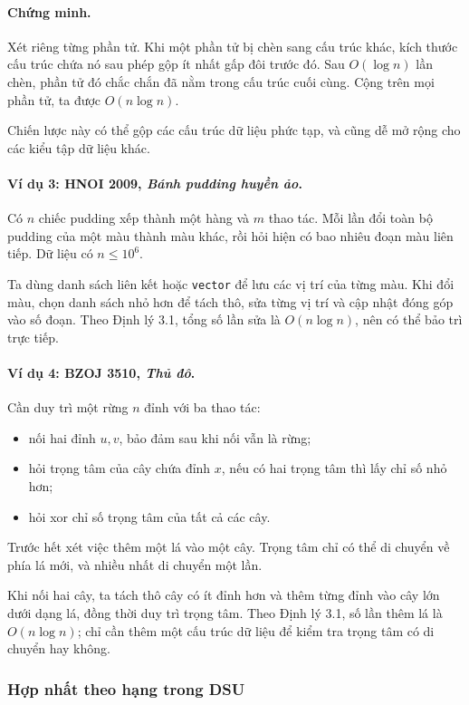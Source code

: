 \documentclass[11pt]{article}
\begin{document}
\paragraph{Chứng minh.}
Xét riêng từng phần tử. Khi một phần tử bị chèn sang cấu trúc khác, kích thước
cấu trúc chứa nó sau phép gộp ít nhất gấp đôi trước đó. Sau \(O(\log n)\) lần
chèn, phần tử đó chắc chắn đã nằm trong cấu trúc cuối cùng. Cộng trên mọi phần
tử, ta được \(O(n\log n)\).

Chiến lược này có thể gộp các cấu trúc dữ liệu phức tạp, và cũng dễ mở rộng cho
các kiểu tập dữ liệu khác.

\paragraph{Ví dụ 3: HNOI 2009, \emph{Bánh pudding huyền ảo}.}
Có \(n\) chiếc pudding xếp thành một hàng và \(m\) thao tác. Mỗi lần đổi toàn bộ
pudding của một màu thành màu khác, rồi hỏi hiện có bao nhiêu đoạn màu liên
tiếp. Dữ liệu có \(n\le 10^6\).

Ta dùng danh sách liên kết hoặc \texttt{vector} để lưu các vị trí của từng màu.
Khi đổi màu, chọn danh sách nhỏ hơn để tách thô, sửa từng vị trí và cập nhật
đóng góp vào số đoạn. Theo Định lý 3.1, tổng số lần sửa là \(O(n\log n)\), nên
có thể bảo trì trực tiếp.

\paragraph{Ví dụ 4: BZOJ 3510, \emph{Thủ đô}.}
Cần duy trì một rừng \(n\) đỉnh với ba thao tác:
\begin{itemize}
  \item nối hai đỉnh \(u,v\), bảo đảm sau khi nối vẫn là rừng;
  \item hỏi trọng tâm của cây chứa đỉnh \(x\), nếu có hai trọng tâm thì lấy chỉ
  số nhỏ hơn;
  \item hỏi xor chỉ số trọng tâm của tất cả các cây.
\end{itemize}

Trước hết xét việc thêm một lá vào một cây. Trọng tâm chỉ có thể di chuyển về
phía lá mới, và nhiều nhất di chuyển một lần.

Khi nối hai cây, ta tách thô cây có ít đỉnh hơn và thêm từng đỉnh vào cây lớn
dưới dạng lá, đồng thời duy trì trọng tâm. Theo Định lý 3.1, số lần thêm lá là
\(O(n\log n)\); chỉ cần thêm một cấu trúc dữ liệu để kiểm tra trọng tâm có di
chuyển hay không.

\subsubsection{Hợp nhất theo hạng trong DSU}
\end{document}
